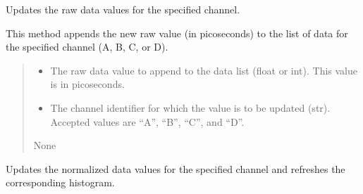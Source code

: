 \documentclass[letterpaper,10pt,english]{sphinxmanual}
\begin{document}
\begin{fulllineitems}
\begin{fulllineitems}
\end{fulllineitems}


\begin{fulllineitems}
\label{\detokenize{StartStopHist:StartStopHist.StartStopLogic.updateDataPure}}
\pysigstartsignatures
{}
\pysigstopsignatures
\sphinxAtStartPar
Updates the raw data values for the specified channel.

\sphinxAtStartPar
This method appends the new raw value (in picoseconds) to the list of data for the specified 
channel (A, B, C, or D).
\begin{quote}\begin{description}
\begin{itemize}
\item {} 
\sphinxAtStartPar
{} \textendash{} The raw data value to append to the data list (float or int). 
This value is in picoseconds.

\item {} 
\sphinxAtStartPar
{} \textendash{} The channel identifier for which the value is to be updated (str). 
Accepted values are “A”, “B”, “C”, and “D”.

\end{itemize}

\sphinxAtStartPar
None

\end{description}\end{quote}

\end{fulllineitems}


\begin{fulllineitems}
\label{\detokenize{StartStopHist:StartStopHist.StartStopLogic.updateSignal}}
\pysigstartsignatures
{}
\pysigstopsignatures
\sphinxAtStartPar
Updates the normalized data values for the specified channel and refreshes the corresponding histogram.


\end{fulllineitems}
\end{fulllineitems}
\end{document}
